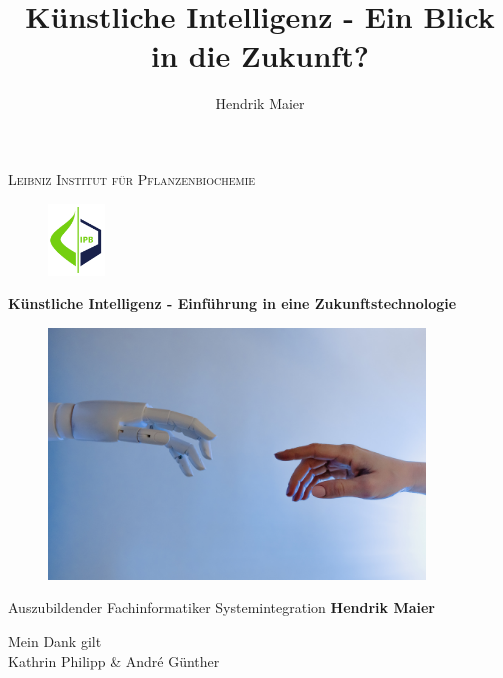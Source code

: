 \documentclass[12pt,german,ngerman]{report}
\title{Künstliche Intelligenz - Ein Blick in die Zukunft?}
\author{Hendrik Maier}
\date{}
\begin{document}
    \begin{titlepage}
        \vspace*{\fill}
            \begin{center}
                 \centering
                 {\scshape\LARGE Leibniz Institut für Pflanzenbiochemie\par}
                 \vspace{1cm}
                 \begin{figure}[h]
                     \includegraphics[width=1.5cm]{ipb_logo.png}
                     \centering
                 \end{figure}
                 {\huge\bfseries Künstliche Intelligenz - Einführung in eine Zukunftstechnologie\par}
                 \vspace{1cm}
                 \begin{figure}[h]
                     \includegraphics[width=10cm]{michelangelo_ki.jpg}
                     \centering
                 \end{figure}
                 \vspace{1cm}
                 {\Large Auszubildender Fachinformatiker Systemintegration \textbf{Hendrik Maier}\par}
                 \vfill
            \end{center}    
        \vspace*{\fill}
    \end{titlepage}
    
    \newpage
        \vspace*{\fill}
            \begin{center}
                Mein Dank gilt \\
                Kathrin Philipp \& Andr\'e Günther
            \end{center}    
        \vspace*{\fill}
    \newpage
\end{document}
